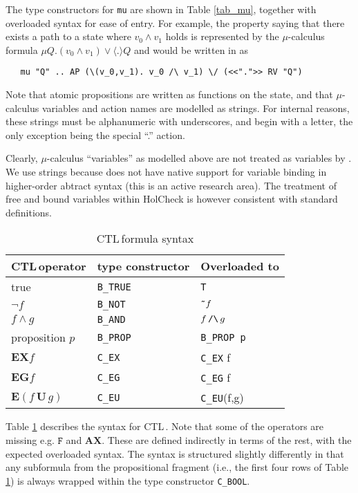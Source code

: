 \documentclass[12pt,fleqn]{article}
\newcommand{\ctl}{\textsf{CTL}\,}
\newcommand{\hc}{HolCheck}
\newcommand{\hand}{\texttt{/\char'134}}
\newcommand{\hnot}{\texttt{\~{}}}
\begin{document}
The type constructors for \texttt{mu}  are shown in Table \ref{tab_mu}, together with overloaded syntax for ease of entry. For example, the property saying that there exists a path to a state where \( v_0 \land v_1 \) holds is represented by the \(\mu\)-calculus formula \( \mu Q. (v_0 \land v_1) \lor \langle.\rangle Q \) and would be written in \HOL{} as

\begin{verbatim}
   mu "Q" .. AP (\(v_0,v_1). v_0 /\ v_1) \/ (<<".">> RV "Q")
\end{verbatim}

Note that atomic propositions are written as functions on the state, and that \(\mu\)-calculus variables and action names are modelled as \HOL{} strings. For internal reasons, these strings must be alphanumeric with underscores, and begin with a letter, the only exception being the special ``.'' action.

Clearly, \(\mu\)-calculus ``variables'' as modelled above are not treated as variables by \HOL{}. We use strings because \HOL{} does not have native support for variable binding in higher-order abtract syntax (this is an active research area). The treatment of free and bound variables within \hc{} is however consistent with standard definitions.

\begin{table}
\caption{\HOL{} \ctl formula syntax}
\label{tab_ctl}
\begin{tabular}{|l|l|l|}
\hline
\ctl operator & \HOL{} type constructor & Overloaded to \\
\hline
true & \texttt{B\_TRUE} & \texttt{T} \\
$\lnot f$ & \texttt{B\_NOT} & $\hnot f $  \\
$f \land g$ & \texttt{B\_AND} & $f\,\hand\,g$ \\
proposition $p$ & \texttt{B\_PROP} & \texttt{B\_PROP p} \\
$\mathbf{EX} f$ & \texttt{C\_EX} & \texttt{C\_EX} f \\
$\mathbf{EG} f$ & \texttt{C\_EG} & \texttt{C\_EG} f \\
$\mathbf{E}(f\,\mathbf{U}\,g)$ & \texttt{C\_EU} & \texttt{C\_EU}(f,g) \\
\hline
\end{tabular}
\end{table}

Table \ref{tab_ctl} describes the syntax for \ctl \index{holCheckLib!properties!ctl@\ctl}. Note that some of the operators are missing e.g. \( \mathtt{F} \) and \( \mathbf{AX} \). These are defined indirectly in terms of the rest, with the expected overloaded syntax. The syntax is structured slightly differently in that any subformula from the propositional fragment (i.e., the first four rows of Table \ref{tab_ctl}) is always wrapped within the type constructor \texttt{C\_BOOL}.
\end{document}
